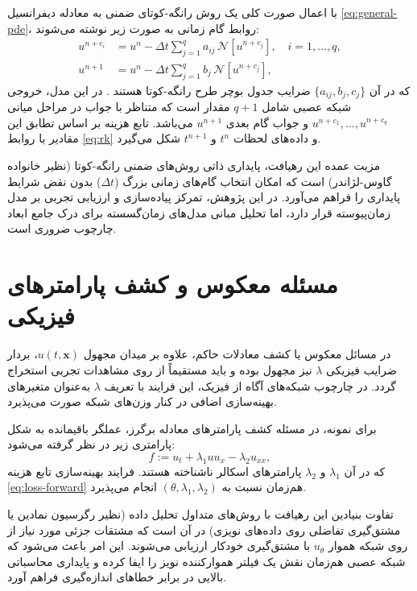 با اعمال صورت کلی یک روش رانگه-کوتای ضمنی به معادله دیفرانسیل \eqref{eq:general-pde}، روابط گام زمانی به صورت زیر نوشته می‌شوند:
\begin{equation}
\begin{aligned}
u^{n+c_i} &= u^n - \Delta t \sum_{j=1}^{q} a_{ij}\, \mathcal{N}[u^{n+c_j}], \quad i=1,\dots,q, \\
u^{n+1} &= u^n - \Delta t \sum_{j=1}^{q} b_j\, \mathcal{N}[u^{n+c_j}],
\end{aligned}
\label{eq:rk}
\end{equation}
که در آن $\{a_{ij}, b_j, c_j\}$ ضرایب جدول بوچر طرح رانگه-کوتا هستند \cite{butcher2016}. در این مدل، خروجی شبکه عصبی شامل $q+1$ مقدار است که متناظر با جواب در مراحل میانی $u^{n+c_1},\dots,u^{n+c_q}$ و جواب گام بعدی $u^{n+1}$ می‌باشد. تابع هزینه بر اساس تطابق این مقادیر با روابط \eqref{eq:rk} و داده‌های لحظات $t^n$ و $t^{n+1}$ شکل می‌گیرد.

مزیت عمده این رهیافت، پایداری ذاتی روش‌های ضمنی رانگه-کوتا (نظیر خانواده گاوس-لژاندر) است که امکان انتخاب گام‌های زمانی بزرگ ($\Delta t$) بدون نقض شرایط پایداری را فراهم می‌آورد. در این پژوهش، تمرکز پیاده‌سازی و ارزیابی تجربی بر مدل زمان‌پیوسته قرار دارد، اما تحلیل مبانی مدل‌های زمان‌گسسته برای درک جامع ابعاد چارچوب ضروری است.

\section{مسئله معکوس و کشف پارامترهای فیزیکی}
\label{sec:inverse}

در مسائل معکوس یا کشف معادلات حاکم، علاوه بر میدان مجهول $u(t,\mathbf{x})$، بردار ضرایب فیزیکی $\lambda$ نیز مجهول بوده و باید مستقیماً از روی مشاهدات تجربی استخراج گردد. در چارچوب شبکه‌های آگاه از فیزیک، این فرایند با تعریف $\lambda$ به‌عنوان متغیرهای بهینه‌سازی اضافی در کنار وزن‌های شبکه صورت می‌پذیرد.

برای نمونه، در مسئله کشف پارامترهای معادله برگرز، عملگر باقیمانده به شکل پارامتری زیر در نظر گرفته می‌شود:
\begin{equation}
f := u_t + \lambda_1 u u_x - \lambda_2 u_{xx},
\label{eq:burgers-f-inv}
\end{equation}
که در آن $\lambda_1$ و $\lambda_2$ پارامترهای اسکالر ناشناخته هستند. فرایند بهینه‌سازی تابع هزینه \eqref{eq:loss-forward} هم‌زمان نسبت به $(\theta, \lambda_1, \lambda_2)$ انجام می‌پذیرد.

تفاوت بنیادین این رهیافت با روش‌های متداول تحلیل داده (نظیر رگرسیون نمادین یا مشتق‌گیری تفاضلی روی داده‌های نویزی) در آن است که مشتقات جزئی مورد نیاز از روی شبکه هموار $u_\theta$ با مشتق‌گیری خودکار ارزیابی می‌شوند. این امر باعث می‌شود که شبکه عصبی هم‌زمان نقش یک فیلتر هموارکننده نویز را ایفا کرده و پایداری محاسباتی بالایی در برابر خطاهای اندازه‌گیری فراهم آورد.


